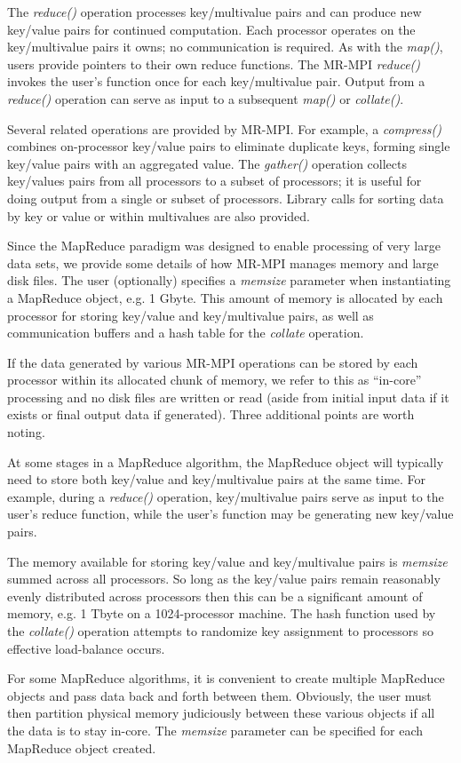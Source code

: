 The {\it reduce()} operation processes key/multivalue pairs and can
produce new key/value pairs for continued computation.  Each processor
operates on the key/multivalue pairs it owns; no communication is
required.  As with the {\it map()}, users provide pointers to their
own reduce functions.  The MR-MPI {\it reduce()} invokes the user's
function once for each key/multivalue pair.  Output from a {\it
reduce()} operation can serve as input to a subsequent {\it map()} or
{\it collate()}.

Several related operations are provided by MR-MPI.  For example, a
{\it compress()} combines on-processor key/value pairs to eliminate
duplicate keys, forming single key/value pairs with an aggregated
value.  The {\it gather()} operation collects key/values pairs from
all processors to a subset of processors; it is useful for doing
output from a single or subset of processors.  Library calls for
sorting data by key or value or within multivalues are also provided.

Since the MapReduce paradigm was designed to enable processing of very
large data sets, we provide some details of how MR-MPI manages memory
and large disk files.  The user (optionally) specifies a {\it memsize}
parameter when instantiating a MapReduce object, e.g. 1 Gbyte.  This
amount of memory is allocated by each processor for storing key/value
and key/multivalue pairs, as well as communication buffers and a hash
table for the {\it collate{}} operation.

If the data generated by various MR-MPI operations can be stored by
each processor within its allocated chunk of memory, we refer to this
as ``in-core'' processing and no disk files are written or read (aside
from initial input data if it exists or final output data if
generated).  Three additional points are worth noting.

At some stages in a MapReduce algorithm, the MapReduce object will
typically need to store both key/value and key/multivalue pairs at the
same time.  For example, during a {\it reduce()} operation,
key/multivalue pairs serve as input to the user's reduce function,
while the user's function may be generating new key/value pairs.

The memory available for storing key/value and key/multivalue pairs is
{\it memsize} summed across all processors.  So long as the key/value
pairs remain reasonably evenly distributed across processors then this
can be a significant amount of memory, e.g. 1 Tbyte on a
1024-processor machine.  The hash function used by the {\it collate()}
operation attempts to randomize key assignment to processors so
effective load-balance occurs.

For some MapReduce algorithms, it is convenient to create multiple
MapReduce objects and pass data back and forth between them.
Obviously, the user must then partition physical memory judiciously
between these various objects if all the data is to stay in-core.  The
{\it memsize} parameter can be specified for each MapReduce object
created.

